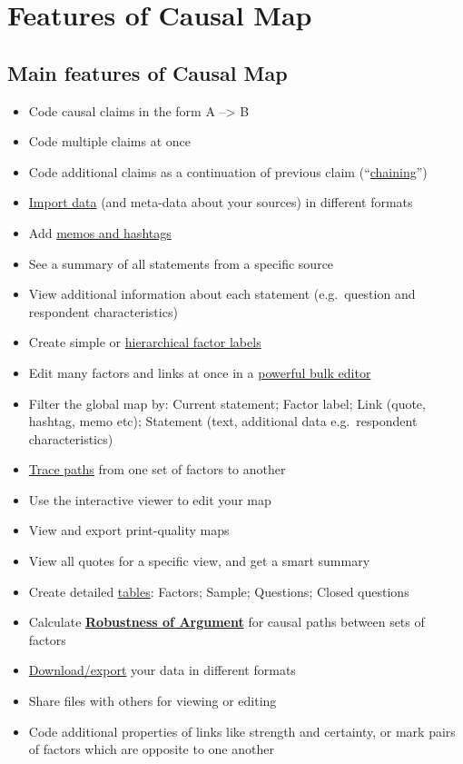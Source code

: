 \documentclass[
]{book}
\providecommand{\tightlist}{%
  \setlength{\itemsep}{0pt}\setlength{\parskip}{0pt}}
\begin{document}
\hypertarget{features-of-causal-map}{%
\chapter{Features of Causal Map}\label{features-of-causal-map}}

\hypertarget{main-features-of-causal-map}{%
\section{Main features of Causal Map}\label{main-features-of-causal-map}}

\begin{itemize}
\tightlist
\item
  Code causal claims in the form A --\textgreater{} B
\item
  Code multiple claims at once
\item
  Code additional claims as a continuation of previous claim (``\protect\hyperlink{xchaining-links}{chaining}'')
\item
  \protect\hyperlink{ximport}{Import data} (and meta-data about your sources) in different formats
\item
  Add \protect\hyperlink{xmemosandhashtags}{memos and hashtags}
\item
  See a summary of all statements from a specific source
\item
  View additional information about each statement (e.g.~question and respondent characteristics)
\item
  Create simple or \protect\hyperlink{xhierarchical-coding}{hierarchical factor labels}
\item
  Edit many factors and links at once in a \protect\hyperlink{factor-editor}{powerful bulk editor}
\item
  Filter the global map by: Current statement; Factor label; Link (quote, hashtag, memo etc); Statement (text, additional data e.g.~respondent characteristics)
\item
  \protect\hyperlink{xrobustness}{Trace paths} from one set of factors to another
\item
  Use the interactive viewer to edit your map
\item
  View and export print-quality maps
\item
  View all quotes for a specific view, and get a smart summary
\item
  Create detailed \protect\hyperlink{core-tables}{tables}: Factors; Sample; Questions; Closed questions
\item
  Calculate \protect\hyperlink{xrobustness}{\textbf{Robustness of Argument}} for causal paths between sets of factors
\item
  \protect\hyperlink{xroundtripping}{Download/export} your data in different formats
\item
  Share files with others for viewing or editing
\item
  Code additional properties of links like strength and certainty, or mark pairs of factors which are opposite to one another
\end{itemize}
\end{document}
